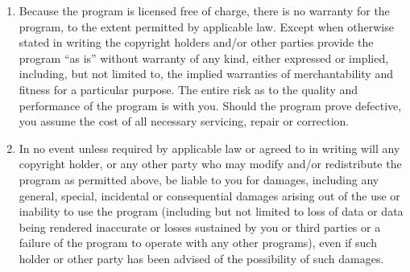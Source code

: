 \begin{enumerate}

\addtocounter{enumi}{9}

\item
Because the program is licensed free of charge, there is no warranty
for the program, to the extent permitted by applicable law.  Except when
otherwise stated in writing the copyright holders and/or other parties
provide the program ``as is'' without warranty of any kind, either expressed
or implied, including, but not limited to, the implied warranties of
merchantability and fitness for a particular purpose.  The entire risk as
to the quality and performance of the program is with you.  Should the
program prove defective, you assume the cost of all necessary servicing,
repair or correction.

\item
In no event unless required by applicable law or agreed to in writing
will any copyright holder, or any other party who may modify and/or
redistribute the program as permitted above, be liable to you for damages,
including any general, special, incidental or consequential damages arising
out of the use or inability to use the program (including but not limited
to loss of data or data being rendered inaccurate or losses sustained by
you or third parties or a failure of the program to operate with any other
programs), even if such holder or other party has been advised of the
possibility of such damages.
\end{enumerate}

